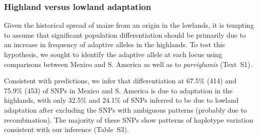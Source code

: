 {{%
% 

\subsubsection{Highland versus lowland adaptation}  

Given the historical spread of maize from an origin in the lowlands, it is tempting to assume that significant population differentiation should be primarily due to an increase in frequency of adaptive alleles in the highlands.
To test this hypothesis, we sought to identify the adaptive allele at each locus using comparisons between Mexico and S. America as well as to \emph{parviglumis} (Text~S1).

Consistent with predictions, we infer that differentiation at 67.5\% (414) and 75.9\% (453) of SNPs in Mexico and S. America is due to adaptation in the highlands, with only 32.5\% and 24.1\% of SNPs inferred to be due to lowland adaptation after excluding the SNPs with ambiguous patterns (probably due to recombination). 
The majority of these SNPs show patterns of haplotype variation consistent with our inference (Table~S3).

%

%
%
%

}}
